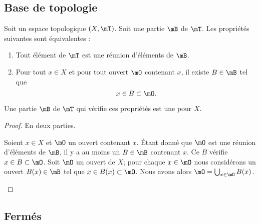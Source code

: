 \subsection{Base de topologie}

\begin{propositionDef}  \label{DEFooLEHPooIlNmpi}
	Soit un espace topologique \( (X,\mT)\). Soit une partie \( \mB\) de \( \mT\). Les propriétés suivantes sont équivalentes :
	\begin{enumerate}
		\item\label{ITEMooCTPEooRCaxvx}
		Tout élément de \( \mT\) est une réunion d'éléments de \( \mB\).
		\item       \label{ITEMooWOVWooRozYmM}
		      Pour tout \( x\in X\) et pour tout ouvert \( \mO\) contenant \( x\), il existe \( B\in \mB\) tel que
		      \begin{equation}
			      x\in B\subset \mO.
		      \end{equation}
	\end{enumerate}
	Une partie \( \mB\) de \( \mT\) qui vérifie ces propriétés est une  pour \( X\).
\end{propositionDef}

\begin{proof}
	En deux parties.
	\begin{subproof}
		Soient \( x\in X\) et \( \mO\) un ouvert contenant \( x\). Étant donné que \( \mO\) est une réunion d'éléments de \( \mB\), il y a au moins un \( B\in \mB\) contenant \( x\). Ce \( B\) vérifie \( x\in B\subset \mO\).
		Soit \( \mO\) un ouvert de \( X\); pour chaque \( x\in\mO\) nous considérons un ouvert \( B(x)\in \mB\) tel que \( x\in B(x)\subset\mO\). Nous avons alors \( \mO=\bigcup_{x\in \mO}B(x)\).
	\end{subproof}
\end{proof}

\subsection{Fermés}

